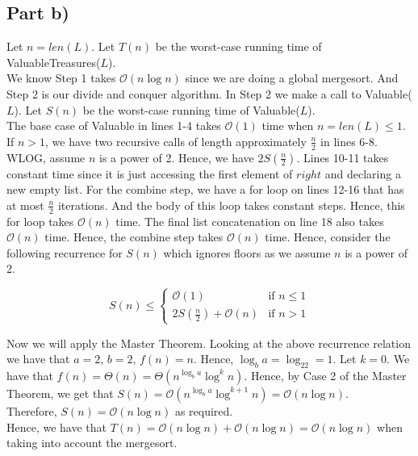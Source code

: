 \documentclass[12pt]{article}
\begin{document}
\subsection*{Part b)}

Let $n = len(L)$. Let $T(n)$ be the worst-case running time of ValuableTreasures($L$). \\

We know Step 1 takes $\mathcal{O}(n\log n)$ since we are doing a global mergesort. And Step 2 is our divide and conquer algorithm. In Step 2 we make a call to Valuable($L$). Let $S(n)$ be the worst-case running time of Valuable($L$). \\

The base case of Valuable in lines 1-4 takes $\mathcal{O}(1)$ time when $n = len(L) \leq 1$. If $n > 1$, we have two recursive calls of length approximately $\frac{n}{2}$ in lines 6-8. WLOG, assume $n$ is a power of 2. Hence, we have $2S(\frac{n}{2})$. Lines 10-11 takes constant time since it is just accessing the first element of $right$ and declaring a new empty list. For the combine step, we have a for loop on lines 12-16 that has at most $\frac{n}{2}$ iterations. And the body of this loop takes constant steps. Hence, this for loop takes $\mathcal{O}(n)$ time. The final list concatenation on line 18 also takes $\mathcal{O}(n)$ time. Hence, the combine step takes $\mathcal{O}(n)$ time. Hence, consider the following recurrence for $S(n)$ which ignores floors as we assume $n$ is a power of 2. 

\[
  S(n) \leq
  \begin{cases}
        \mathcal{O}(1) & \text{if $n \leq 1$} \\
        2S(\frac{n}{2}) + \mathcal{O}(n) & \text{if $n > 1$} 
  \end{cases}
\]

Now we will apply the Master Theorem. Looking at the above recurrence relation we have that $a = 2$, $b = 2$, $f(n) = n$. Hence, $\log_ba = \log_22 = 1$. Let $k = 0$. We have that $f(n) = \Theta(n) = \Theta(n^{\log_ba}\log^kn)$. Hence, by Case 2 of the Master Theorem, we get that $S(n) = \mathcal{O}(n^{\log_ba}\log^{k+1}n) = \mathcal{O}(n\log n)$. \\

Therefore, $S(n) = \mathcal{O}(n\log n)$ as required. \\

Hence, we have that $T(n) = \mathcal{O}(n\log n) + \mathcal{O}(n\log n) = \mathcal{O}(n\log n)$ when taking into account the mergesort. \\
\end{document}
